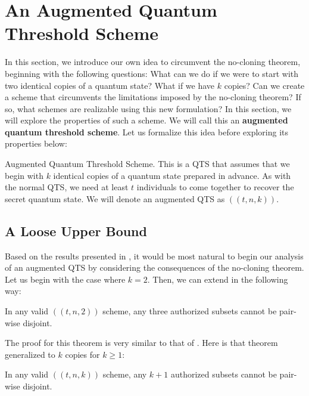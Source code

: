 \chapter{An Augmented Quantum Threshold Scheme}
\label{ch:good-stuff}

In this section, we introduce our own idea to circumvent the no-cloning theorem, beginning with the following questions: What can we do if we were to start with two identical copies of a quantum state? What if we have $k$ copies? Can we create a scheme that circumvents the limitations imposed by the no-cloning theorem? If so, what schemes are realizable using this new formulation? In this section, we will explore the properties of such a scheme. We will call this an \textbf{augmented quantum threshold scheme}. Let us formalize this idea before exploring its properties below:

\theoremstyle{definition}
\begin{definition}{Augmented Quantum Threshold Scheme.}
    \label{defn:augmented-qts}
     This is a QTS that assumes that we begin with $k$ identical copies of a quantum state prepared in advance. As with the normal QTS, we need at least $t$ individuals to come together to recover the secret quantum state. We will denote an augmented QTS as $((t,n,k))$.
\end{definition}

\section{A Loose Upper Bound}

Based on the results presented in , it would be most natural to begin our analysis of an augmented QTS by considering the consequences of the no-cloning theorem. Let us begin with the case where $k=2$. Then, we can extend  in the following way:

\begin{theorem}
    \label{thm:three-authorized}
    In any valid $((t,n,2))$ scheme, any three authorized subsets cannot be pair-wise disjoint.
\end{theorem}

The proof for this theorem is very similar to that of . Here is that theorem generalized to $k$ copies for $k \geq 1$:

\begin{theorem}
    \label{thm:k-authorized}
    In any valid $((t,n,k))$ scheme, any $k+1$ authorized subsets cannot be pair-wise disjoint.
\end{theorem}

